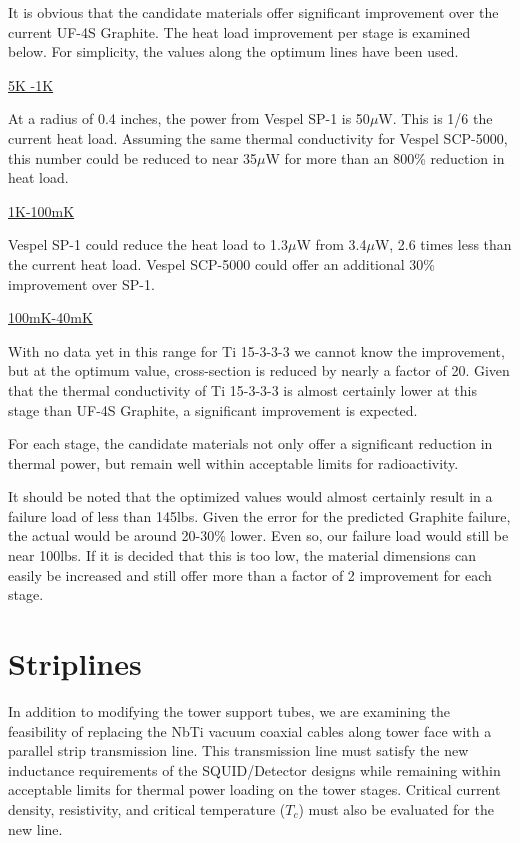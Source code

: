 \documentclass{report}
\begin{document}
It is obvious that the candidate materials offer significant improvement over the current UF-4S Graphite. The heat load improvement per stage is examined below. For simplicity,
the values along the optimum lines have been used.

\smallskip

\large{\underline{5K -1K}}

At a radius of 0.4 inches, the power from Vespel SP-1 is 50$\mu$W. This is 1/6 the current heat load. Assuming the same thermal conductivity for Vespel SCP-5000, this number could
be reduced to near 35$\mu$W for more than an 800\% reduction in heat load.

\smallskip

\underline{{\large 1K-100mK}}

Vespel SP-1 could reduce the heat load to 1.3$\mu$W from 3.4$\mu$W, 2.6 times less than the current heat load. Vespel SCP-5000 could offer an additional 30\% improvement over SP-1.

\smallskip

\underline{{\large 100mK-40mK}}

With no data yet in this range for Ti 15-3-3-3 we cannot know the improvement, but at the optimum value, cross-section is reduced by nearly a factor of 20. Given that the thermal
conductivity of Ti 15-3-3-3 is almost certainly lower at this stage than UF-4S Graphite, a significant improvement is expected.

\bigskip

For each stage, the candidate materials not only offer a significant reduction in thermal power, but remain well within acceptable limits for radioactivity.

It should be noted that the optimized values would almost certainly result in a failure load of less than 145lbs. Given the error for the predicted Graphite failure, the actual
would be around 20-30\% lower. Even so, our failure load would still be near 100lbs. If it is decided that this is too low, the material dimensions can easily be increased and
still offer more than a factor of 2 improvement for each stage.

\section{Striplines}
In addition to modifying the tower support tubes, we are examining the feasibility of replacing the NbTi vacuum coaxial cables along tower face with a parallel strip transmission
line. This transmission line must satisfy the new inductance requirements of the SQUID/Detector designs while remaining within acceptable limits for thermal power loading on the
tower stages. Critical current density, resistivity, and critical temperature ($T_{c}$) must also be evaluated for the new line.
\end{document}
